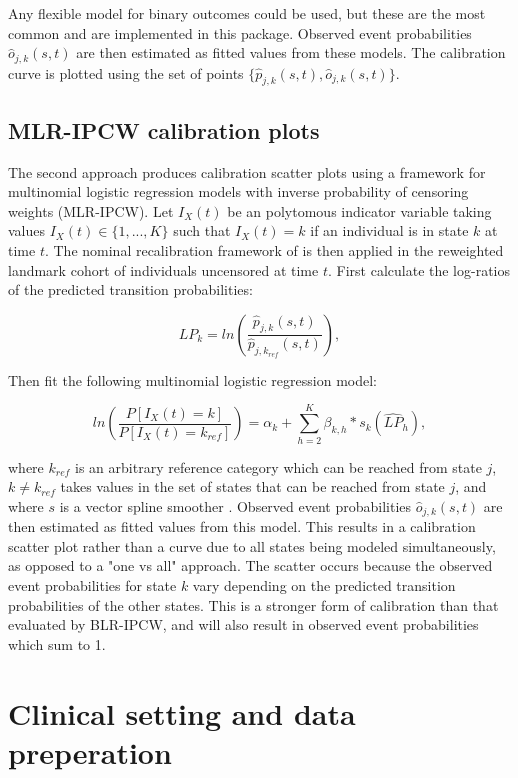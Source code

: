 \documentclass[nojss]{jss}
\begin{document}
Any flexible model for binary outcomes could be used, but these are the most common and are implemented in this package. Observed event probabilities $\hat{o}_{j,k}(s,t)$ are then estimated as fitted values from these models. The calibration curve is plotted using the set of points $\{\hat{p}_{j, k}(s, t), \hat{o}_{j,k}(s,t)\}$.

\subsection{MLR-IPCW calibration plots} \label{sec:mlripcw}

The second approach produces calibration scatter plots using a framework for multinomial logistic regression models with inverse probability of censoring weights (MLR-IPCW). Let $I_{X}(t)$ be an polytomous indicator variable taking values $I_{X}(t) \in \{1, ..., K\}$ such that $I_{X}(t) = k$ if an individual is in state $k$ at time $t$. The nominal recalibration framework of \cite{VanHoorde2014, VanHoorde2015} is then applied in the reweighted landmark cohort of individuals uncensored at time $t$. First calculate the log-ratios of the predicted transition probabilities:

$$\hat{LP}_{k} = ln\left(\frac{\hat{p}_{j, k}(s, t)}{\hat{p}_{j, k_{ref}}(s, t)}\right),$$

Then fit the following multinomial logistic regression model:

$$ln\left(\frac{P[I_{X}(t) = k]}{P[I_{X}(t) = k_{ref}]}\right) = \alpha_{k} + \sum_{h=2}^{K} \beta_{k,h}*s_{k}(\hat{LP}_{h}),$$

where $k_{ref}$ is an arbitrary reference category which can be reached from state $j$, $k \neq k_{ref}$ takes values in the set of states that can be reached from state $j$, and where $s$ is a vector spline smoother \citep{Yee2015}. Observed event probabilities $\hat{o}_{j,k}(s,t)$ are then estimated as fitted values from this model. This results in a calibration scatter plot rather than a curve due to all states being modeled simultaneously, as opposed to a "one vs all" approach. The scatter occurs because the observed event probabilities for state $k$ vary depending on the predicted transition probabilities of the other states. This is a stronger \citep{VanCalster2016} form of calibration than that evaluated by BLR-IPCW, and will also result in observed event probabilities which sum to 1.

\section{Clinical setting and data preperation} \label{sec:dataprep}
\end{document}
